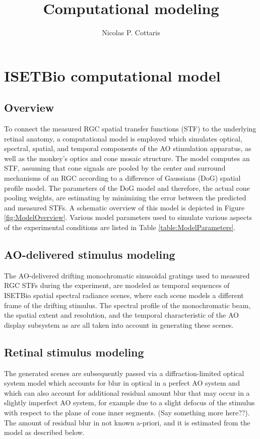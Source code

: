 \documentclass[11pt, oneside]{article}   	%
\title{Computational modeling}
\author{Nicolas P. Cottaris}
\date{}							%
\begin{document}
\maketitle
\section{ISETBio computational model}
\subsection{Overview}
To connect the measured RGC spatial transfer functions (STF) to the underlying retinal anatomy, a computational model is employed which simulates optical, spectral, spatial, and temporal components of the AO stimulation apparatus, as well as the monkey's optics and cone mosaic structure. The model computes an STF, assuming that cone signals are pooled by the center and surround mechanisms of an RGC according to a difference of Gaussians (DoG) spatial profile model. The parameters of the DoG model and therefore, the actual cone pooling weights, are estimating by minimizing the error between the predicted and measured STFs. A schematic overview of this model is depicted in Figure \ref{fig:ModelOverview}. Various model parameters used to simulate various aspects of the experimental conditions are listed in Table \ref{table:ModelParameters}.

\subsection{AO-delivered stimulus modeling}
The AO-delivered drifting monochromatic sinusoidal gratings used to measured RGC STFs during the experiment, are modeled as temporal sequences of ISETBio spatial spectral radiance scenes, where each scene models a different frame of the drifting stimulus. The spectral profile of the monochromatic beam, the spatial extent and resolution, and the temporal characteristic of the AO display subsystem as are all taken into account in generating these scenes. 

\subsection{Retinal stimulus modeling}
The generated scenes are subsequently passed via a diffraction-limited optical system model which accounts for blur in optical in a perfect AO system and which can also account for additional residual amount blur that may occur in a slightly imperfect AO system, for example due to a slight defocus of the stimulus with respect to the plane of cone inner segments. (Say something more here??). The amount of residual blur in not known a-priori, and it is estimated from the model as described below. 
\end{document}
